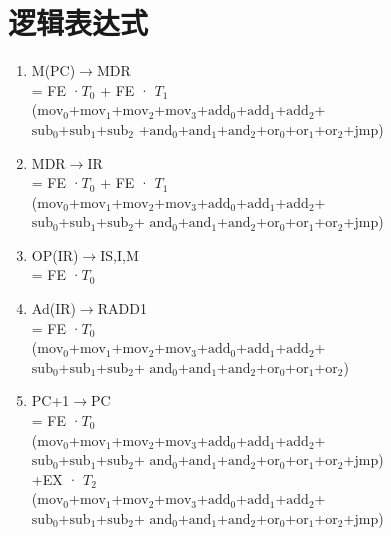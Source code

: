 \documentclass[UTF8]{ctexrep}
\begin{document}
\section{逻辑表达式}
\begin{enumerate}
\item M(PC)$\to$MDR\\
= FE ·\(T_{0}\) + FE · \(T_{1}\)\\
($\mathrm{mov_0}$+$\mathrm{mov_1}$+$\mathrm{mov_2}$+$\mathrm{mov_3}$+$\mathrm{add_0}$+$\mathrm{add_1}$+$\mathrm{add_2}$+\\
$\mathrm{sub_0}$+$\mathrm{sub_1}$+$\mathrm{sub_2}$
+$\mathrm{and_0}$+$\mathrm{and_1}$+$\mathrm{and_2}$+$\mathrm{or_0}$+$\mathrm{or_1}$+$\mathrm{or_2}$+jmp)\\

\item MDR$\to$IR\\
= FE ·\(T_{0}\) + FE · \(T_{1}\)\\
($\mathrm{mov_0}$+$\mathrm{mov_1}$+$\mathrm{mov_2}$+$\mathrm{mov_3}$+$\mathrm{add_0}$+$\mathrm{add_1}$+$\mathrm{add_2}$+\\
$\mathrm{sub_0}$+$\mathrm{sub_1}$+$\mathrm{sub_2}$+
$\mathrm{and_0}$+$\mathrm{and_1}$+$\mathrm{and_2}$+$\mathrm{or_0}$+$\mathrm{or_1}$+$\mathrm{or_2}$+jmp)\\

\item OP(IR)$\to$IS,I,M\\
= FE ·\(T_{0}\)\\

\item Ad(IR)$\to$RADD1\\
= FE ·\(T_{0}\)\\ ($\mathrm{mov_0}$+$\mathrm{mov_1}$+$\mathrm{mov_2}$+$\mathrm{mov_3}$+$\mathrm{add_0}$+$\mathrm{add_1}$+$\mathrm{add_2}$+\\
$\mathrm{sub_0}$+$\mathrm{sub_1}$+$\mathrm{sub_2}$+
$\mathrm{and_0}$+$\mathrm{and_1}$+$\mathrm{and_2}$+$\mathrm{or_0}$+$\mathrm{or_1}$+$\mathrm{or_2}$)\\

\item PC+1$\to$PC\\
= FE ·\(T_{0}\)\\ ($\mathrm{mov_0}$+$\mathrm{mov_1}$+$\mathrm{mov_2}$+$\mathrm{mov_3}$+$\mathrm{add_0}$+$\mathrm{add_1}$+$\mathrm{add_2}$+\\
$\mathrm{sub_0}$+$\mathrm{sub_1}$+$\mathrm{sub_2}$+
$\mathrm{and_0}$+$\mathrm{and_1}$+$\mathrm{and_2}$+$\mathrm{or_0}$+$\mathrm{or_1}$+$\mathrm{or_2}$+jmp)\\
+EX · \(T_{2}\)\\
($\mathrm{mov_0}$+$\mathrm{mov_1}$+$\mathrm{mov_2}$+$\mathrm{mov_3}$+$\mathrm{add_0}$+$\mathrm{add_1}$+$\mathrm{add_2}$+\\
$\mathrm{sub_0}$+$\mathrm{sub_1}$+$\mathrm{sub_2}$+
$\mathrm{and_0}$+$\mathrm{and_1}$+$\mathrm{and_2}$+$\mathrm{or_0}$+$\mathrm{or_1}$+$\mathrm{or_2}$+jmp)\\


\end{enumerate}
\end{document}
